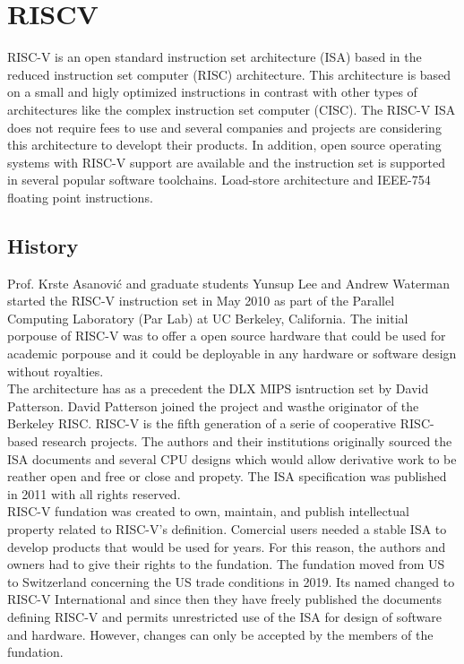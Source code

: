 \section{RISCV}

RISC-V is an open standard instruction set architecture (ISA) based in the reduced instruction set computer (RISC) architecture. This architecture is based on a small and higly optimized instructions in contrast with other types of architectures like the complex instruction set computer (CISC). The RISC-V ISA does not require fees to use and several companies and projects  are considering this architecture to developt their products. In addition, open source operating systems with RISC-V support are available and the instruction set is supported in several popular software toolchains. Load-store architecture and IEEE-754 floating point instructions. 

\subsection{History}

Prof. Krste Asanović and graduate students Yunsup Lee and Andrew Waterman started the RISC-V instruction set in May 2010 as part of the Parallel Computing Laboratory (Par Lab) at UC Berkeley, California.  The initial porpouse of RISC-V was to offer a open source hardware that could be used for academic porpouse and it could be deployable in any hardware or software design without royalties.\\

The architecture has as a precedent the DLX MIPS isntruction set by David Patterson. David Patterson joined the project and wasthe originator of the Berkeley RISC. RISC-V is the fifth generation of a serie of cooperative RISC-based research projects. The authors and their institutions originally sourced the ISA documents and several CPU designs which would allow derivative work to be reather open and free or close and propety. The ISA specification was published in 2011  with all rights reserved. \\

RISC-V fundation was created to own, maintain, and publish intellectual property related to RISC-V's definition. Comercial users needed a stable ISA to develop products that would be used for years. For this reason, the authors and owners had to give their rights to the fundation. The fundation moved from US to Switzerland concerning the US trade conditions in 2019. Its named changed to RISC-V International  and since then they have freely published the documents defining RISC-V and permits unrestricted use of the ISA for design of software and hardware. However, changes can only be accepted by the members of the fundation. 

